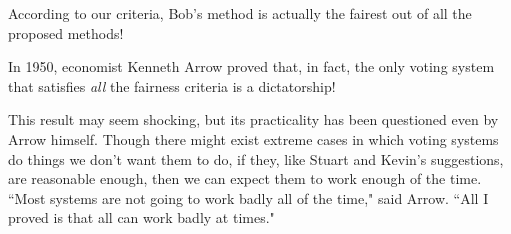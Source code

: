 \documentclass{article}
\begin{document}
According to our criteria, Bob’s method is actually the fairest out of all the proposed methods! 

In 1950, economist Kenneth Arrow proved that, in fact, the only voting system that satisfies \textit{all} the fairness criteria is a dictatorship! 

This result may seem shocking, but its practicality has been questioned even by Arrow himself. Though there might exist extreme cases in which voting systems do things we don’t want them to do, if they, like Stuart and Kevin’s suggestions, are reasonable enough, then we can expect them to work enough of the time. ``Most systems are not going to work badly all of the time," said Arrow. ``All I proved is that all can work badly at times."
\end{document}
